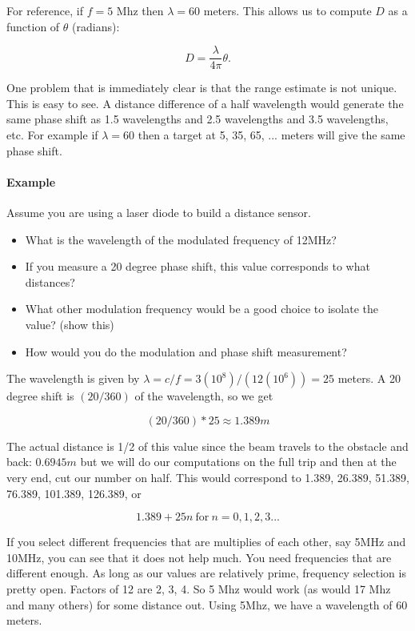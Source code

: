 For reference, if \(f = 5\) Mhz then \(\lambda = 60\) meters. This
allows us to compute \(D\) as a function of \(\theta\) (radians):

\[D = \frac{\lambda}{4\pi}\theta .\]

One problem that is immediately clear is that the range estimate is not
unique. This is easy to see. A distance difference of a half wavelength
would generate the same phase shift as 1.5 wavelengths and 2.5
wavelengths and 3.5 wavelengths, etc. For example if \(\lambda = 60\)
then a target at 5, 35, 65, ... meters will give the same phase shift.

\hypertarget{example}{%
\paragraph{Example}\label{example}}

Assume you are using a laser diode to build a distance sensor.

\begin{itemize}
\tightlist
\item
  What is the wavelength of the modulated frequency of 12MHz?
\item
  If you measure a 20 degree phase shift, this value corresponds to what
  distances?
\item
  What other modulation frequency would be a good choice to isolate the
  value? (show this)
\item
  How would you do the modulation and phase shift measurement?
\end{itemize}

The wavelength is given by \(\lambda = c/f = 3(10^8)/(12(10^6)) = 25\)
meters. A 20 degree shift is \((20/360)\) of the wavelength, so we get

\[(20/360)*25 \approx 1.389m\]

The actual distance is 1/2 of this value since the beam travels to the
obstacle and back: \(0.6945m\) but we will do our computations on the
full trip and then at the very end, cut our number on half. This would
correspond to 1.389, 26.389, 51.389, 76.389, 101.389, 126.389, or

\[1.389 + 25n ~\mbox{for}~ n=0,1,2,3 ...\]

If you select different frequencies that are multiplies of each other,
say 5MHz and 10MHz, you can see that it does not help much. You need
frequencies that are different enough. As long as our values are
relatively prime, frequency selection is pretty open. Factors of 12 are
2, 3, 4. So 5 Mhz would work (as would 17 Mhz and many others) for some
distance out. Using 5Mhz, we have a wavelength of 60 meters.

